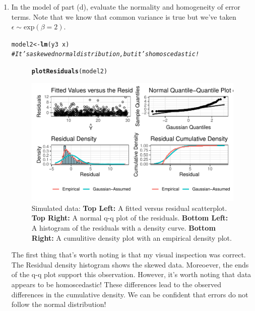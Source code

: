 \documentclass{article}\usepackage[]{graphicx}\usepackage[]{color}
\makeatletter
\def\maxwidth{ %
  \ifdim\Gin@nat@width>\linewidth
    \linewidth
  \else
    \Gin@nat@width
  \fi
}
\newcommand{\hlcom}[1]{\textcolor[rgb]{0.678,0.584,0.686}{\textit{#1}}}%
\newcommand{\hlopt}[1]{\textcolor[rgb]{0,0,0}{#1}}%
\newcommand{\hlstd}[1]{\textcolor[rgb]{0.345,0.345,0.345}{#1}}%
\newcommand{\hlkwb}[1]{\textcolor[rgb]{0.69,0.353,0.396}{#1}}%
\newcommand{\hlkwd}[1]{\textcolor[rgb]{0.737,0.353,0.396}{\textbf{#1}}}%
\newenvironment{kframe}{%
 \def\at@end@of@kframe{}%
 \ifinner\ifhmode%
  \def\at@end@of@kframe{\end{minipage}}%
  \begin{minipage}{\columnwidth}%
 \fi\fi%
 \def\FrameCommand##1{\hskip\@totalleftmargin \hskip-\fboxsep
 \colorbox{shadecolor}{##1}\hskip-\fboxsep
     \hskip-\linewidth \hskip-\@totalleftmargin \hskip\columnwidth}%
 \MakeFramed {\advance\hsize-\width
   \@totalleftmargin\z@ \linewidth\hsize
   \@setminipage}}%
 {\par\unskip\endMakeFramed%
 \at@end@of@kframe}
\newenvironment{knitrout}{}{} %
\makeatother
\begin{document}
\begin{enumerate}
\begin{enumerate}
  \item In the model of part (d), evaluate the normality and homogeneity of error 
  terms. Note that we know that common variance is true but we've taken $\epsilon \sim 
  \textrm{exp}(\beta=2)$.
\begin{knitrout}
\color{fgcolor}\begin{kframe}
\begin{alltt}
\hlstd{model2} \hlkwb{<-} \hlkwd{lm}\hlstd{(y3}\hlopt{~}\hlstd{x)}
\hlcom{#It's a skewed normal distribution, but it's homoscedastic!}
\end{alltt}
\end{kframe}
\end{knitrout}

\begin{figure}[H]
\begin{center}
\begin{knitrout}
\color{fgcolor}\begin{kframe}
\begin{alltt}
\hlkwd{plotResiduals}\hlstd{(model2)}
\end{alltt}
\end{kframe}
\includegraphics[width=\maxwidth]{figure/p3plot5-1} 
\end{knitrout}
\caption{Simulated data: \textbf{Top Left:} A fitted versus residual scatterplot.
\textbf{Top Right:} A normal q-q plot of the residuals. \textbf{Bottom Left:} A histogram of the residuals with a density curve. \textbf{Bottom Right:} A cumulitive density plot with an empirical density plot.}
\label{p3plot5}
\end{center}
\end{figure}

The first thing that's worth noting is that my visual inspection was correct. The Residual density histogram shows the skewed data. Moreoever, the ends of the q-q plot support this observation. However, it's worth noting that data appears to be homoscedastic! These differences lead to the observed differences in the cumulative density. We can be confident that errors do not follow the normal distribution!


\end{enumerate}
\end{enumerate}
\end{document}
